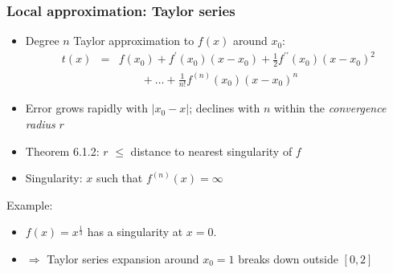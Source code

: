 \documentclass[bigger]{beamer}
\begin{document}
\begin{frame}%
\frametitle{Local approximation: Taylor series}

\begin{itemize}
\item Degree $n$ Taylor approximation to $f\left( x\right) $ around $x_{0}$: 
\begin{eqnarray*}
t(x) &=&f(x_{0})+f^{\prime }(x_{0})(x-x_{0})+\frac{1}{2}f^{\prime \prime
}(x_{0})(x-x_{0})^{2} \\
&&\quad \quad +\ldots +\frac{1}{n!}f^{(n)}(x_{0})(x-x_{0})^{n}
\end{eqnarray*}

\item Error grows rapidly with $\left\vert x_{0}-x\right\vert $; \newline
declines with $n$ within the \emph{convergence radius }$r$

\item Theorem 6.1.2: $r$ $\leq $ distance to nearest singularity of $f$

\item Singularity: $x$ such that $f^{(n)}(x)=\infty $
\end{itemize}

Example:

\begin{itemize}
\item $f(x)=x^{\frac{1}{3}}$ has a singularity at $x=0$.

\item $\Rightarrow $ Taylor series expansion around $x_{0}=1$ \newline
breaks down outside $[0,2]$
\end{itemize}

\end{frame}%
\end{document}
